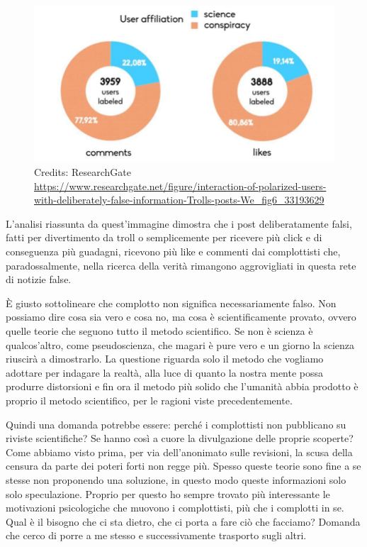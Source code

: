 \documentclass[12pt]{book} %
\begin{document}
\begin{mdframed}[linewidth=1pt]
\bigskip

\begin{figure}[H]
  \centering
  \includegraphics[width=0.95\linewidth]{images/Libro-img013.png}
  \caption{Credits: ResearchGate \protect\url{https://www.researchgate.net/figure/interaction-of-polarized-users-with-deliberately-false-information-Trolls-posts-We\_fig6\_33193629}}
\end{figure}


L'analisi riassunta da quest'immagine dimostra che i post deliberatamente
falsi, fatti per divertimento da troll o semplicemente per ricevere più click e di conseguenza più guadagni, ricevono
più like e commenti dai complottisti che, paradossalmente, nella ricerca della verità rimangono aggrovigliati in questa
rete di notizie false.


\bigskip

È giusto sottolineare che complotto non significa necessariamente falso. Non possiamo dire cosa sia vero e cosa no, ma
cosa è scientificamente provato, ovvero quelle teorie che seguono tutto il metodo scientifico. Se non è scienza è
qualcos'altro, come pseudoscienza, che magari è pure vero e un giorno la scienza riuscirà a
dimostrarlo. La questione riguarda solo il metodo che vogliamo adottare per indagare la realtà, alla luce di quanto la
nostra mente possa produrre distorsioni e fin ora il metodo più solido che l'umanità abbia
prodotto è proprio il metodo scientifico, per le ragioni viste precedentemente.


\bigskip

Quindi una domanda potrebbe essere: perché i complottisti non pubblicano su riviste scientifiche? Se hanno così a cuore
la divulgazione delle proprie scoperte? Come abbiamo visto prima, per via dell'anonimato sulle
revisioni, la scusa della censura da parte dei poteri forti non regge più. Spesso queste teorie sono fine a se stesse
non proponendo una soluzione, in questo modo queste informazioni solo solo speculazione. Proprio per questo ho sempre
trovato più interessante le motivazioni psicologiche che muovono i complottisti, più che i complotti in se. Qual è il
bisogno che ci sta dietro, che ci porta a fare ciò che facciamo? Domanda che cerco di porre a me stesso e
successivamente trasporto sugli altri.



\end{mdframed}
\end{document}
